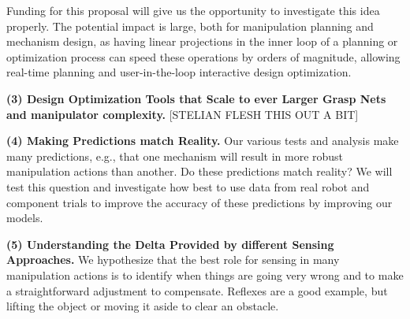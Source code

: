 Funding for this proposal will give us the opportunity to investigate this idea properly.   The potential impact is large, both for manipulation planning and mechanism design, as having linear projections in the inner loop of a planning or optimization process can speed these operations by orders of magnitude, allowing real-time planning and user-in-the-loop interactive design optimization.

\smallskip\noindent
{\bf (3) Design Optimization Tools that Scale to ever Larger Grasp Nets and manipulator complexity.}   [STELIAN FLESH THIS OUT A BIT]

 \smallskip\noindent
{\bf (4)  Making Predictions match Reality.}   Our various tests and analysis make many predictions, e.g., that one mechanism will result in more robust manipulation actions than another.  Do these predictions match reality?  We will test this question and investigate how best to use data from real robot and component trials to improve the accuracy of these predictions by improving our models.

 \smallskip\noindent
{\bf (5) Understanding the Delta Provided by different Sensing Approaches.}  We hypothesize that the best role for sensing in many manipulation actions is to identify when things are going very wrong and to make a straightforward adjustment to compensate.   Reflexes are a good example, but lifting the object or moving it aside to clear an obstacle.


